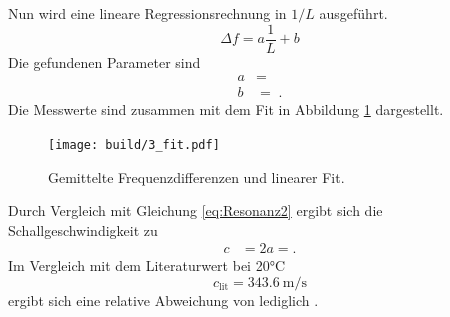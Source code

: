 
Nun wird eine lineare Regressionsrechnung in $1/L$ ausgeführt.
\begin{equation}
  \Delta f = a\frac{1}{L} + b
\end{equation}
Die gefundenen Parameter sind
\begin{align*}
  a &=  \\
  b &=  \; .
\end{align*}
Die Messwerte sind zusammen mit dem Fit in Abbildung \ref{fig:3_fitSchall} dargestellt.
\begin{figure}
  \centering  \texttt{[image: build/3\_fit.pdf]}  \caption{Gemittelte Frequenzdifferenzen und linearer Fit.} \label{fig:3_fitSchall}
\end{figure}
Durch Vergleich mit Gleichung \eqref{eq:Resonanz2} ergibt sich die Schallgeschwindigkeit zu
\begin{align}
  c &= 2a =  .
  \label{eq:Schallgeschwindigkeit}
\end{align}
Im Vergleich mit dem Literaturwert bei 20°C \cite{sound}
\begin{equation*}
  c_\text{lit} = \SI{343.6}{\meter\per\second}
\end{equation*}
ergibt sich eine relative Abweichung von lediglich $$.

